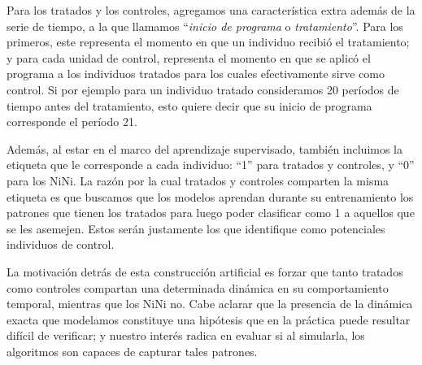 \documentclass[../../main.tex]{subfiles}
\begin{document}
Para los tratados y los controles, agregamos una característica extra además de la serie
de tiempo, a la que llamamos ``\textit{inicio de programa} o \textit{tratamiento}''. Para
los primeros, este representa el momento en que un individuo recibió el tratamiento; y
para cada unidad de control, representa el momento en que se aplicó el programa a los
individuos tratados para los cuales efectivamente sirve como control. Si por ejemplo para
un individuo tratado consideramos 20 períodos de tiempo antes del tratamiento, esto quiere
decir que su inicio de programa corresponde el período 21.

Además, al estar en el marco del aprendizaje supervisado, también incluimos la etiqueta
que le corresponde a cada individuo: ``1'' para tratados y controles, y ``0'' para los
NiNi. La razón por la cual tratados y controles comparten la misma etiqueta es que
buscamos que los modelos aprendan durante su entrenamiento los patrones que tienen los
tratados para luego poder clasificar como 1 a aquellos que se les asemejen. Estos serán
justamente los que identifique como potenciales individuos de control.

La motivación detrás de esta construcción artificial es forzar que tanto tratados como
controles compartan una determinada dinámica en su comportamiento temporal, mientras que
los NiNi no. Cabe aclarar que la presencia de la dinámica exacta que modelamos constituye
una hipótesis que en la práctica puede resultar difícil de verificar; y nuestro interés
radica en evaluar si al simularla, los algoritmos son capaces de capturar tales patrones.
\end{document}
